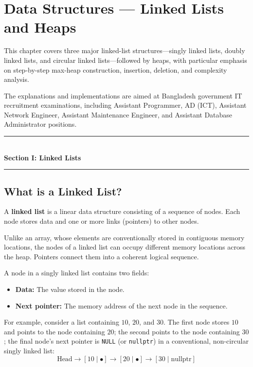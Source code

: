 \chapter{Data Structures --- Linked Lists and Heaps}
\label{ch:linked_lists_and_heaps}

This chapter covers three major linked-list structures---singly linked lists, doubly linked lists, and circular linked lists---followed by heaps, with particular emphasis on step-by-step max-heap construction, insertion, deletion, and complexity analysis.

The explanations and implementations are aimed at Bangladesh government IT recruitment examinations, including Assistant Programmer, AD (ICT), Assistant Network Engineer, Assistant Maintenance Engineer, and Assistant Database Administrator positions.

\begin{center}
\vspace{0.5em}
{\color{primary}\rule{0.45\textwidth}{1.2pt}}\\[4pt]
{\Large\bfseries\color{primary} Section I: Linked Lists}\\[2pt]
{\color{primary}\rule{0.45\textwidth}{1.2pt}}
\vspace{0.5em}
\end{center}

\section{What is a Linked List?}

A \textbf{linked list} is a linear data structure consisting of a sequence of nodes. Each node stores data and one or more links (pointers) to other nodes.

Unlike an array, whose elements are conventionally stored in contiguous memory locations, the nodes of a linked list can occupy different memory locations across the heap. Pointers connect them into a coherent logical sequence.

A node in a singly linked list contains two fields:
\begin{itemize}
    \item \textbf{Data:} The value stored in the node.
    \item \textbf{Next pointer:} The memory address of the next node in the sequence.
\end{itemize}

For example, consider a list containing $10$, $20$, and $30$. The first node stores $10$ and points to the node containing $20$; the second points to the node containing $30$; the final node's next pointer is \texttt{NULL} (or \texttt{nullptr}) in a conventional, non-circular singly linked list:
\[
\text{Head} \longrightarrow [10 \mid \bullet] \longrightarrow [20 \mid \bullet] \longrightarrow [30 \mid \text{nullptr}]
\]


